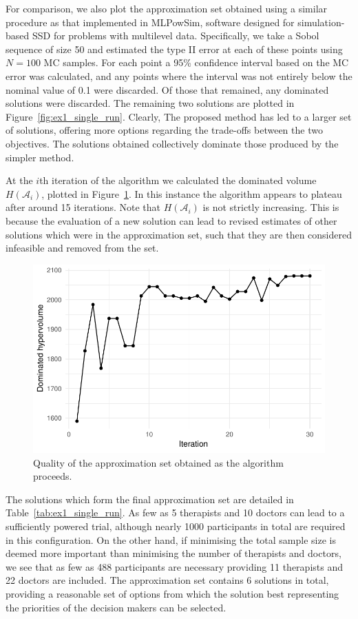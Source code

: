 \documentclass{article} %
\begin{document}
For comparison, we also plot the approximation set obtained using a similar procedure as that implemented in MLPowSim, software designed for simulation-based SSD for problems with multilevel data. Specifically, we take a Sobol sequence of size 50 and estimated the type II error at each of these points using $N = 100$ MC samples. For each point a 95\% confidence interval based on the MC error was calculated, and any points where the interval was not entirely below the nominal value of 0.1 were discarded. Of those that remained, any dominated solutions were discarded. The remaining two solutions are plotted in Figure~\ref{fig:ex1_single_run}. Clearly, The proposed method has led to a larger set of solutions, offering more options regarding the trade-offs between the two objectives. The solutions obtained collectively dominate those produced by the simpler method.

At the $i$th iteration of the algorithm we calculated the dominated volume $H(\mathcal{A}_{i})$, plotted in Figure~\ref{fig:ex1_traj}. In this instance the algorithm appears to plateau after around 15 iterations. Note that $H(\mathcal{A}_{i})$ is not strictly increasing. This is because the evaluation of a new solution can lead to revised estimates of other solutions which were in the approximation set, such that they are then considered infeasible and removed from the set. 

\begin{figure}
\centering
\includegraphics[scale=0.8]{./Figures/ex1_traj}
\caption{Quality of the approximation set obtained as the algorithm proceeds.}
\label{fig:ex1_traj}
\end{figure}

The solutions which form the final approximation set are detailed in Table~\ref{tab:ex1_single_run}. As few as 5 therapists and 10 doctors can lead to a sufficiently powered trial, although nearly 1000 participants in total are required in this configuration. On the other hand, if minimising the total sample size is deemed more important than minimising the number of therapists and doctors, we see that as few as 488 participants are necessary providing 11 therapists and 22 doctors are included. The approximation set contains 6 solutions in total, providing a reasonable set of options from which the solution best representing the priorities of the decision makers can be selected.
\end{document}
